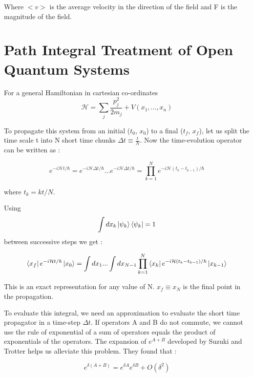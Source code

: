 Where $<v>$ is the average velocity in the direction of the field and F is the magnitude of the field.
 
\section{Path Integral Treatment of Open Quantum Systems}



For a general Hamiltonian in cartesian co-ordinates $$\mathcal{H} = \sum_{j} \frac{p_j^2}{2m_j} + V(x_1, ..., x_n)$$

To propagate this system from an initial ($t_0$, $x_0$) to a final ($t_f$, $x_f$), let us split the time scale t into N short time chunks $\Delta t \equiv \frac{t}{N}$. Now the time-evolution operator can be written as :

\begin{equation} \label{4.x}
    e^{-i\mathcal{H}t/\hbar} = e^{-i\mathcal{H}\Delta t/\hbar}...e^{-i\mathcal{H}\Delta t/\hbar} = \prod_{k=1}^{N} e^{-i\mathcal{H}(t_k - t_{k-1})/\hbar}
\end{equation}

where $t_k = kt/N$. 

Using $$\int dx_k \ket{\psi_k}\bra{\psi_k} = 1$$ between successive steps we get :

\begin{equation} \label{4.xx}
    \bra{x_f} e^{-i\mathcal{H}t/\hbar} \ket{x_0} = \int dx_1 ... \int dx_{N-1} \prod_{k=1}^{N} \bra{x_k} e^{-i\mathcal{H}(t_k - t_{k-1})/\hbar} \ket{x_{k-1}}
\end{equation}

This is an exact representation for any value of N. $x_f \equiv x_N$ is the final point in the  propagation.

To evaluate this integral, we need an approximation to evaluate the short time propagator in a time-step $\Delta t$. If operators A and B do not commute, we cannot use the rule of exponential of a sum of operators equals the product of exponentials of the operators. The expansion of $e^{A+B}$ developed by Suzuki and Trotter \cite{trotter1959} helps us alleviate this problem. They found that :

\begin{equation}\label{4.x}
e^{\delta(A + B)} = e^{\delta A}e^{\delta B} + O(\delta^2)
\end{equation}

